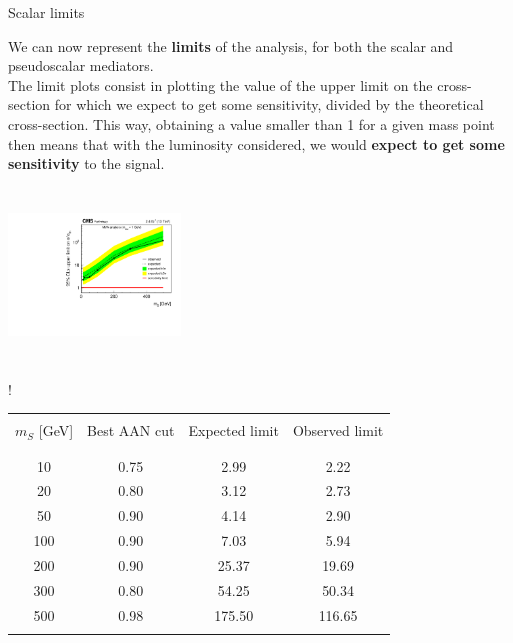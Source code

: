 \documentclass[handout,8 pt]{beamer}
\begin{document}
\begin{frame}{Scalar limits}

	\justifying
	We can now represent the \textbf{limits} of the analysis, for both the scalar and pseudoscalar mediators. \\ \vspace{8pt} The limit plots consist in plotting the value of the upper limit on the cross-section for which we expect to get some sensitivity, divided by the theoretical cross-section. This way, obtaining a value smaller than 1 for a given mass point then means that with the luminosity considered, we would \textbf{expect to get some sensitivity} to the signal. \vfill

	\hspace{4pt}
   \begin{minipage}[c]{.02\linewidth}
	\begin{exampleblock}{}  \end{exampleblock}
   \end{minipage}	
   \hspace{5pt}	
   \begin{minipage}[c]{.40\linewidth}
   	\begin{center}
		\vspace{15pt}
		\includegraphics[width=130pt, height=130pt]{figs/limits_scalar.pdf}
	\end{center}
   \end{minipage} \hfill
    \begin{minipage}[c]{.52\linewidth}
   	\begin{center}
	\resizebox{175pt} {!}{
   	\begin{tabular}{c|c|c|c}
		& & & \\
		$m_S$ [GeV]& Best AAN cut & Expected limit & Observed limit \\ 
		& & & \\ 
		\hline \hline
		& & & \\
		10 & 0.75 & 2.99 & 2.22 \\
            	20 & 0.80 & 3.12 & 2.73 \\
            	50 & 0.90 & 4.14 & 2.90 \\
            	100 & 0.90 & 7.03 & 5.94 \\
            	200 & 0.90 & 25.37 & 19.69 \\
            	300 & 0.80 & 54.25 & 50.34 \\
            	500 & 0.98 & 175.50 & 116.65 \\
		& & & \\
          \end{tabular}
          }
          \end{center}
   \end{minipage} \hfill \vfill
   

\end{frame}
\end{document}
